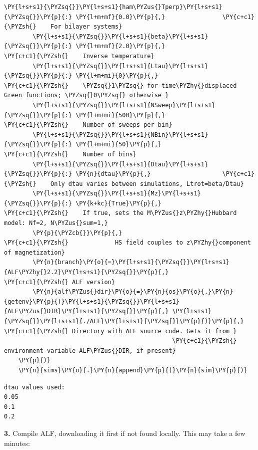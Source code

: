 \begin{tcolorbox}[breakable, size=fbox, boxrule=1pt, pad at break*=1mm,colback=cellbackground, colframe=cellborder]
\begin{Verbatim}[commandchars=\\\{\}]
        \PY{l+s+s1}{\PYZsq{}}\PY{l+s+s1}{ham\PYZus{}Tperp}\PY{l+s+s1}{\PYZsq{}}\PY{p}{:} \PY{l+m+mf}{0.0}\PY{p}{,}                \PY{c+c1}{\PYZsh{}    For bilayer systems}
        \PY{l+s+s1}{\PYZsq{}}\PY{l+s+s1}{beta}\PY{l+s+s1}{\PYZsq{}}\PY{p}{:} \PY{l+m+mf}{2.0}\PY{p}{,}                     \PY{c+c1}{\PYZsh{}    Inverse temperature}
        \PY{l+s+s1}{\PYZsq{}}\PY{l+s+s1}{Ltau}\PY{l+s+s1}{\PYZsq{}}\PY{p}{:} \PY{l+m+mi}{0}\PY{p}{,}                       \PY{c+c1}{\PYZsh{}    \PYZsq{}1\PYZsq{} for time\PYZhy{}displaced Green functions; \PYZsq{}0\PYZsq{} otherwise }
        \PY{l+s+s1}{\PYZsq{}}\PY{l+s+s1}{NSweep}\PY{l+s+s1}{\PYZsq{}}\PY{p}{:} \PY{l+m+mi}{500}\PY{p}{,}                   \PY{c+c1}{\PYZsh{}    Number of sweeps per bin}
        \PY{l+s+s1}{\PYZsq{}}\PY{l+s+s1}{NBin}\PY{l+s+s1}{\PYZsq{}}\PY{p}{:} \PY{l+m+mi}{50}\PY{p}{,}                      \PY{c+c1}{\PYZsh{}    Number of bins}
        \PY{l+s+s1}{\PYZsq{}}\PY{l+s+s1}{Dtau}\PY{l+s+s1}{\PYZsq{}}\PY{p}{:} \PY{n}{dtau}\PY{p}{,}                    \PY{c+c1}{\PYZsh{}    Only dtau varies between simulations, Ltrot=beta/Dtau}
        \PY{l+s+s1}{\PYZsq{}}\PY{l+s+s1}{Mz}\PY{l+s+s1}{\PYZsq{}}\PY{p}{:} \PY{k+kc}{True}\PY{p}{,}                      \PY{c+c1}{\PYZsh{}    If true, sets the M\PYZus{}z\PYZhy{}Hubbard model: Nf=2, N\PYZus{}sum=1,}
        \PY{p}{\PYZcb{}}\PY{p}{,}                               \PY{c+c1}{\PYZsh{}             HS field couples to z\PYZhy{}component of magnetization}
        \PY{n}{branch}\PY{o}{=}\PY{l+s+s1}{\PYZsq{}}\PY{l+s+s1}{ALF\PYZhy{}2.2}\PY{l+s+s1}{\PYZsq{}}\PY{p}{,}                      \PY{c+c1}{\PYZsh{} ALF version}
        \PY{n}{alf\PYZus{}dir}\PY{o}{=}\PY{n}{os}\PY{o}{.}\PY{n}{getenv}\PY{p}{(}\PY{l+s+s1}{\PYZsq{}}\PY{l+s+s1}{ALF\PYZus{}DIR}\PY{l+s+s1}{\PYZsq{}}\PY{p}{,} \PY{l+s+s1}{\PYZsq{}}\PY{l+s+s1}{./ALF}\PY{l+s+s1}{\PYZsq{}}\PY{p}{)}\PY{p}{,} \PY{c+c1}{\PYZsh{} Directory with ALF source code. Gets it from }
                                               \PY{c+c1}{\PYZsh{} environment variable ALF\PYZus{}DIR, if present}
    \PY{p}{)}
    \PY{n}{sims}\PY{o}{.}\PY{n}{append}\PY{p}{(}\PY{n}{sim}\PY{p}{)}
\end{Verbatim}
\end{tcolorbox}

    \begin{Verbatim}[commandchars=\\\{\}]
dtau values used:
0.05
0.1
0.2
    \end{Verbatim}

    \textbf{3.} Compile ALF, downloading it first if not found locally. This
may take a few minutes:

